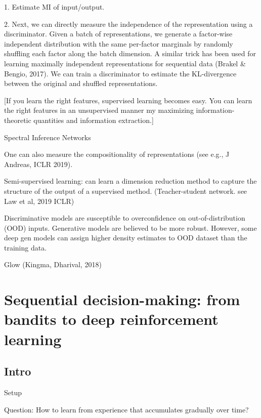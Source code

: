 \documentclass[english]{article}
\begin{document}
1. Estimate MI of input/output. 

2. Next, we can directly measure the independence of the representation using a discriminator. Given a
batch of representations, we generate a factor-wise independent distribution with the same per-factor
marginals by randomly shuffling each factor along the batch dimension. A similar trick has been used
for learning maximally independent representations for sequential data (Brakel \& Bengio, 2017). We
can train a discriminator to estimate the KL-divergence between the original and shuffled representations.


[If you learn the right features, supervised learning becomes easy. You can learn the right features in an unsupervised manner my maximizing information-theoretic quantities and information extraction.]

\item Spectral Inference Networks

One can also measure the compositionality of representations (see e.g., J Andreas, ICLR 2019).

\item Semi-supervised learning: can learn a dimension reduction method to capture the structure of the output of a supervised method. (Teacher-student network. see Law et al, 2019 ICLR)

\item Discriminative models are susceptible to overconfidence on out-of-distribution (OOD) inputs. Generative models are believed to be more robust. However, some deep gen models can assign higher density estimates to OOD dataset than the training data.

\item Glow (Kingma, Dharival, 2018)
\eenum



\section{Sequential decision-making: from bandits to deep reinforcement learning}

\subsection{Intro}

\benum

\item {Setup}
\bitem
\item Question: How to learn from experience that accumulates gradually over time?
\end{document}
